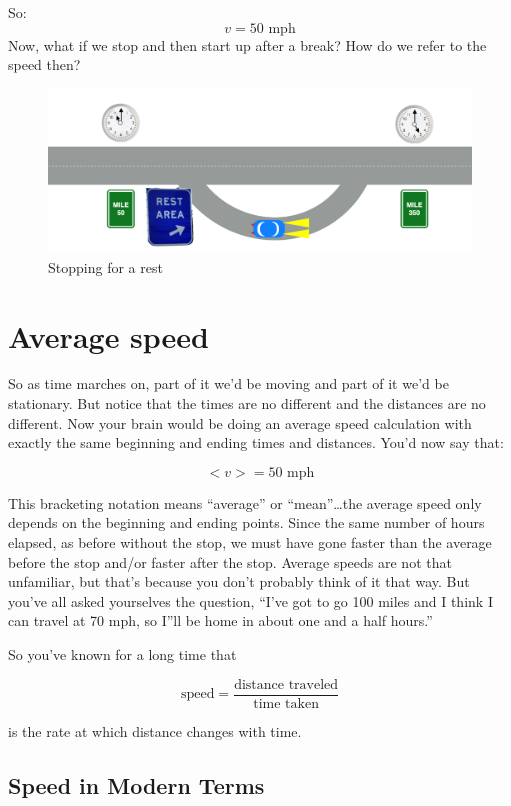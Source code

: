 \documentclass[
  letterpaper,
  DIV=11,
  numbers=noendperiod,
  oneside]{scrreprt}
\begin{document}
So: \[
v=50 \text{ mph}
\] Now, what if we stop and then start up after a break? How do we refer
to the speed then?

\begin{figure}[H]

{\centering \includegraphics[width=0.8\linewidth,height=\textheight,keepaspectratio]{mechanics/motion/screenshot_3646.png}

}

\caption{Stopping for a rest}

\end{figure}%

\section{Average speed}\label{sec-averagespeed}

So as time marches on, part of it we'd be moving and part of it we'd be
stationary. But notice that the times are no different and the distances
are no different. Now your brain would be doing an average speed
calculation with exactly the same beginning and ending times and
distances. You'd now say that:

\[
<v> = 50 \text{ mph}
\]

This bracketing notation means ``average'' or ``mean''\ldots the average
speed only depends on the beginning and ending points. Since the same
number of hours elapsed, as before without the stop, we must have gone
faster than the average before the stop and/or faster after the stop.
Average speeds are not that unfamiliar, but that's because you don't
probably think of it that way. But you've all asked yourselves the
question, ``I've got to go 100 miles and I think I can travel at 70 mph,
so I''ll be home in about one and a half hours.''

So you've known for a long time that

\[
\text{speed} = \dfrac{\text{distance traveled}}{\text{time taken}}
\]

is the rate at which distance changes with time.

\subsection{Speed in Modern Terms}\label{speed-in-modern-terms}
\end{document}
